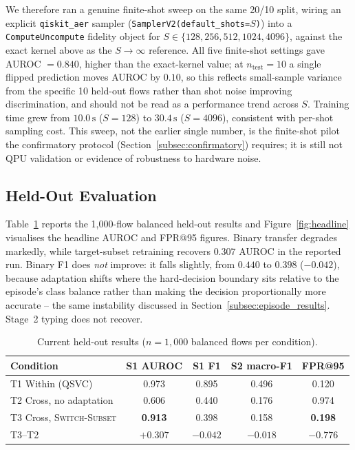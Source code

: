 \documentclass[conference]{IEEEtran}
\begin{document}
We therefore ran a genuine finite-shot sweep on the same 20/10 split,
wiring an explicit \texttt{qiskit\_aer} sampler
(\texttt{SamplerV2(default\_shots=}$S$\texttt{)}) into a
\texttt{ComputeUncompute} fidelity object for
$S \in \{128, 256, 512, 1024, 4096\}$, against the exact kernel above as
the $S\!\to\!\infty$ reference. All five finite-shot settings gave
AUROC $=0.840$, higher than the exact-kernel value; at $n_{\text{test}}=10$
a single flipped prediction moves AUROC by $0.10$, so this reflects
small-sample variance from the specific 10 held-out flows rather than
shot noise improving discrimination, and should not be read as a
performance trend across $S$. Training time grew from $10.0\,\text{s}$
($S{=}128$) to $30.4\,\text{s}$ ($S{=}4096$), consistent with per-shot
sampling cost. This sweep, not the earlier single number, is the
finite-shot pilot the confirmatory protocol
(Section~\ref{subsec:confirmatory}) requires; it is still not QPU
validation or evidence of robustness to hardware noise.

\subsection{Held-Out Evaluation}
\label{subsec:e8c}

Table~\ref{tab:heldout} reports the 1,000-flow balanced held-out results
and Figure~\ref{fig:headline} visualises the headline AUROC and FPR@95
figures. Binary transfer degrades markedly, while target-subset
retraining recovers $0.307$ AUROC in the reported run. Binary F1 does
\emph{not} improve: it falls slightly, from $0.440$ to $0.398$
($-0.042$), because adaptation shifts where the hard-decision boundary
sits relative to the episode's class balance rather than making the
decision proportionally more accurate -- the same instability discussed
in Section~\ref{subsec:episode_results}. Stage~2 typing does not
recover.

\begin{table}[t]
\centering
\caption{Current held-out results ($n=1{,}000$ balanced flows per
condition).}
\label{tab:heldout}
\renewcommand{\arraystretch}{1.1}
\begin{tabular}{@{}lcccc@{}}
\toprule
\textbf{Condition} & \textbf{S1 AUROC} & \textbf{S1 F1}
                   & \textbf{S2 macro-F1} & \textbf{FPR@95} \\
\midrule
T1 Within (QSVC)              & 0.973 & 0.895 & 0.496 & 0.120 \\
T2 Cross, no adaptation       & 0.606 & 0.440 & 0.176 & 0.974 \\
T3 Cross, \textsc{Switch-Subset} & \textbf{0.913} & 0.398 & 0.158 & \textbf{0.198} \\
\midrule
T3--T2 & $+0.307$ & $-0.042$ & $-0.018$ & $-0.776$ \\
\bottomrule
\end{tabular}
\end{table}
\end{document}
